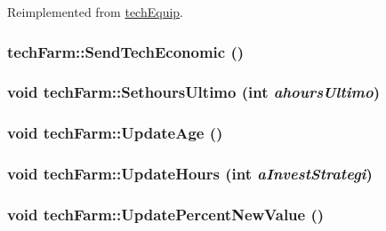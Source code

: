 Reimplemented from \hyperlink{classtech_equip_a7b8543a8ead2be2a6a00d80123895e2c}{techEquip}.\hypertarget{classtech_farm_a2c8c275684f7369e6d7388793d5a5b9c}{
\subsubsection[{SendTechEconomic}]{ techFarm::SendTechEconomic ()}}
\label{classtech_farm_a2c8c275684f7369e6d7388793d5a5b9c}
\hypertarget{classtech_farm_a1cd9afb11ce12b93db384f6f7c6ad275}{
\subsubsection[{SethoursUltimo}]{\setlength{\rightskip}{0pt plus 5cm}void techFarm::SethoursUltimo (int {\em ahoursUltimo})}}
\label{classtech_farm_a1cd9afb11ce12b93db384f6f7c6ad275}
\hypertarget{classtech_farm_af44046acba4d8a743c290004a90e9af0}{
\subsubsection[{UpdateAge}]{\setlength{\rightskip}{0pt plus 5cm}void techFarm::UpdateAge ()}}
\label{classtech_farm_af44046acba4d8a743c290004a90e9af0}
\hypertarget{classtech_farm_a7c57bf770a4d278b5584d42e9f05fab1}{
\subsubsection[{UpdateHours}]{\setlength{\rightskip}{0pt plus 5cm}void techFarm::UpdateHours (int {\em aInvestStrategi})}}
\label{classtech_farm_a7c57bf770a4d278b5584d42e9f05fab1}
\hypertarget{classtech_farm_a541165dae0993a19b3e1df68075e1a5b}{
\subsubsection[{UpdatePercentNewValue}]{\setlength{\rightskip}{0pt plus 5cm}void techFarm::UpdatePercentNewValue ()}}
\label{classtech_farm_a541165dae0993a19b3e1df68075e1a5b}


